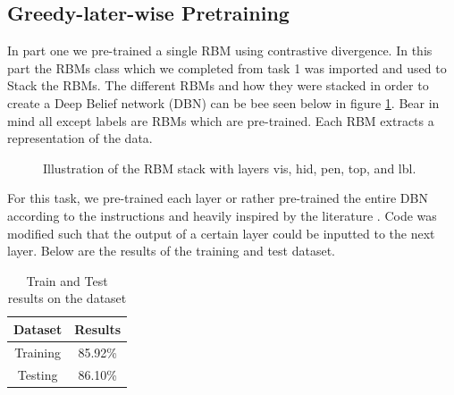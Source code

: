\documentclass[a4paper]{article}
\begin{document}
\subsection{Greedy-later-wise Pretraining}
\label{part2}
In part one we pre-trained a single RBM using contrastive divergence. In this part the RBMs class which we completed from task 1 was imported and used to Stack the RBMs. The different RBMs and how they were stacked in order to create a Deep Belief network (DBN) can be bee seen below in figure \ref{fig:rbm_stack}. Bear in mind all except labels are RBMs which are pre-trained. Each RBM extracts a representation of the data. 

\begin{figure}[htb]
  \centering
  \caption{Illustration of the RBM stack with layers vis, hid, pen, top, and lbl.}
  \label{fig:rbm_stack}
\end{figure}
For this task, we pre-trained each layer or rather pre-trained the entire DBN according to the instructions and heavily inspired by the literature \cite{hinton2006fast} \cite{hinton2012practical}. Code was modified such that the output of a certain layer could be inputted to the next layer. Below are the results of the training and test dataset.

\begin{table}[ht]
\label{table: Results} %
\caption{Train and Test results on the dataset} %
\centering %
\begin{tabular}{|c|c|} %

\hline %
Dataset & Results \\ %
\hline %
Training & 85.92\% \\ %
Testing & 86.10\% \\ %
\hline %
\end{tabular}
\end{table}
\end{document}
